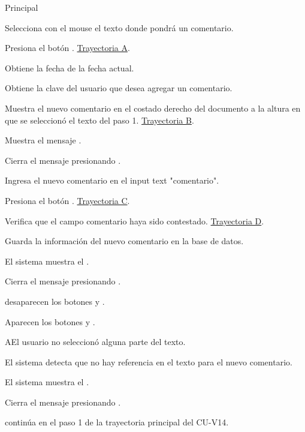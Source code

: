 \begin{UCtrayectoria}{Principal}

    \UCpaso[\UCactor] Selecciona con el mouse el texto donde pondrá un comentario.

    \UCpaso[\UCactor] Presiona el botón . \hyperref[SP2-CU14-A]{Trayectoria A}. 
    
    \UCpaso Obtiene la fecha de la fecha actual. 
    
    \UCpaso Obtiene la clave del usuario que desea agregar un comentario.
    
    \UCpaso Muestra el nuevo comentario en el costado derecho del documento a la altura en que se seleccionó el texto del paso 1. \hyperref[SP2-CU14-B]{Trayectoria B}.
    
    \UCpaso Muestra el mensaje .

    \UCpaso[\UCactor] Cierra el mensaje presionando .
    
    \UCpaso[\UCactor] Ingresa el nuevo comentario en el input text "comentario".
    
    \UCpaso[\UCactor] Presiona el botón . \hyperref[SP2-CU14-C]{Trayectoria C}.
    
    \UCpaso Verifica que el campo comentario haya sido contestado. \hyperref[SP2-CU14-D]{Trayectoria D}.

    \UCpaso Guarda la información del nuevo comentario en la base de datos.

    \UCpaso El sistema muestra el  .

    \UCpaso[\UCactor] Cierra el mensaje presionando .

    \UCpaso desaparecen los botones   y  .

    \UCpaso Aparecen los botones   y  .

\end{UCtrayectoria}

\label{SP2-CU14-A}
\begin{UCtrayectoriaA}{A}{El usuario no seleccionó alguna parte del texto.}

	\UCpaso El sistema detecta que no hay referencia en el texto para el nuevo comentario.

  \UCpaso El sistema muestra el .

  \UCpaso[\UCactor] Cierra el mensaje presionando .

  \UCpaso continúa en el paso 1 de la trayectoria principal del CU-V14.
\end{UCtrayectoriaA}

